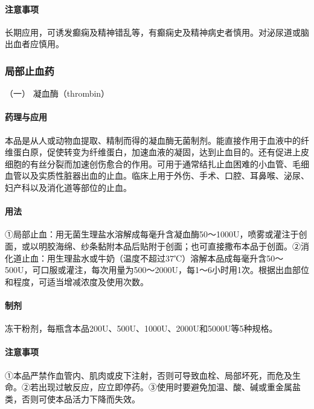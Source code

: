 \paragraph{注意事项}

长期应用，可诱发癫痫及精神错乱等，有癫痫史及精神病史者慎用。对泌尿道或脑出血者应慎用。

\subsubsection{局部止血药}

\hypertarget{text00438.htmlux5cux23CHP17-8-4-1}{}
（一） 凝血酶（thrombin）

\paragraph{药理与应用}

本品是从人或动物血提取、精制而得的凝血酶无菌制剂。能直接作用于血液中的纤维蛋白原，促使转变为纤维蛋白，加速血液的凝固，达到止血目的。还有促进上皮细胞的有丝分裂而加速创伤愈合的作用。可用于通常结扎止血困难的小血管、毛细血管以及实质性脏器出血的止血。临床上用于外伤、手术、口腔、耳鼻喉、泌尿、妇产科以及消化道等部位的止血。

\paragraph{用法}

①局部止血：用无菌生理盐水溶解成每毫升含凝血酶50～1000U，喷雾或灌注于创面，或以明胶海绵、纱条黏附本品后贴附于创面；也可直接撒布本品于创面。②消化道止血：用生理盐水或牛奶（温度不超过37℃）溶解本品成每毫升含50～500U，可口服或灌注，每次用量为500～2000U，每1～6小时用1次。根据出血部位和程度，可适当增减浓度及使用次数。

\paragraph{制剂}

冻干粉剂，每瓶含本品200U、500U、1000U、2000U和5000U等5种规格。

\paragraph{注意事项}

①本品严禁作血管内、肌肉或皮下注射，否则可导致血栓、局部坏死，而危及生命。②若出现过敏反应，应立即停药。③使用时要避免加温、酸、碱或重金属盐类，否则可使本品活力下降而失效。

